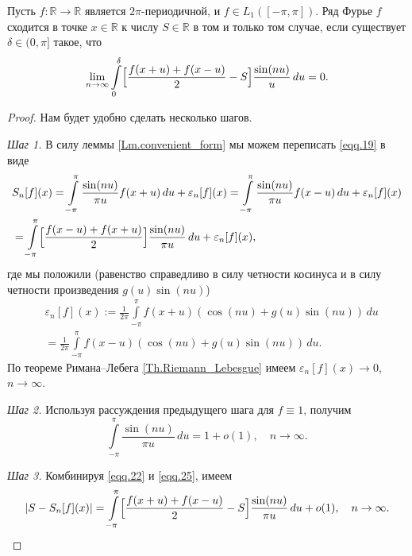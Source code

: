 \begin{theorem}
	\label{Th.abstract_criterion}
	Пусть $f:\mathbb{R} \to \mathbb{R}$ является $2\pi$-периодичной, и $f \in L_{1}([-\pi,\pi])$.
	Ряд Фурье $f$ сходится в точке $x \in \mathbb{R}$ к числу $S \in \mathbb{R}$ в том и только том случае, если существует $\delta \in (0,\pi]$ такое, что
	\begin{equation}
		\label{eqq.22}
		\lim\limits_{n \to \infty}\int\limits_{0}^{\delta}\Bigl[\frac{f(x+u)+f(x-u)}{2}-S\Bigr]\frac{\sin(nu)}{u}\,du = 0.
	\end{equation}
\end{theorem}
\begin{proof} Нам будет удобно сделать несколько шагов.

\textit{Шаг 1.}
В силу леммы \ref{Lm.convenient_form}  мы можем переписать \eqref{eqq.19} в виде
\begin{equation}
	\label{eqq.23}
	\begin{split}
		&S_{n}[f](x)=\int\limits_{-\pi}^{\pi}\frac{\sin(nu)}{\pi u}f(x+u)\,du + \varepsilon_{n}[f](x) = \int\limits_{-\pi}^{\pi}\frac{\sin(nu)}{\pi u}f(x-u)\,du + \varepsilon_{n}[f](x)\\
		&=\int\limits_{-\pi}^{\pi}\Bigl[\frac{f(x-u)+f(x+u)}{2}\Bigr]\frac{\sin(nu)}{\pi u}\,du + \varepsilon_{n}[f](x),
	\end{split}
\end{equation}
где мы положили (равенство справедливо в силу четности косинуса и в силу четности произведения $g(u)\sin(nu)$)
\begin{equation}
	\label{eqq.24}
	\begin{split}
		&\varepsilon_{n}[f](x):=\frac{1}{2\pi}\int\limits_{-\pi}^{\pi}f(x+u)(\cos(nu)+g(u)\sin(nu))\,du\\
		&=\frac{1}{2\pi}\int\limits_{-\pi}^{\pi}f(x-u)(\cos(nu)+g(u)\sin(nu))\,du.
	\end{split}
\end{equation}
По теореме Римана--Лебега \ref{Th.Riemann_Lebesgue} имеем $\varepsilon_{n}[f](x) \to 0$, $n \to \infty$.

\textit{Шаг 2.} Используя рассуждения предыдущего шага для $f \equiv 1$, получим
\begin{equation}
	\label{eqq.25}
	\int\limits_{-\pi}^{\pi}\frac{\sin(nu)}{\pi u}\,du = 1 + o(1), \quad n \to \infty.
\end{equation}

\textit{Шаг 3.} Комбинируя \eqref{eqq.22} и \eqref{eqq.25}, имеем
\begin{equation}
	\label{eqq.26}
	|S-S_{n}[f](x)| = \int\limits_{-\pi}^{\pi}\Bigl[\frac{f(x+u)+f(x-u)}{2}-S\Bigr]\frac{\sin(nu)}{\pi u}\,du + o(1), \quad n \to \infty.
\end{equation}


\end{proof}
